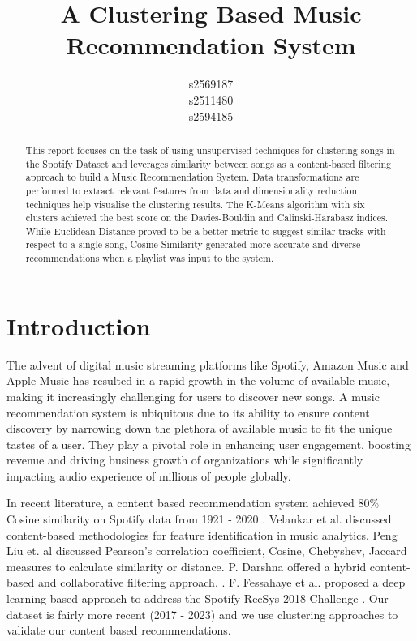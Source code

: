 \documentclass{article}
\title{A Clustering Based Music Recommendation System}
\author{
  s2569187\\
  \And
  s2511480\\
 \And
  s2594185\\
}
\begin{document}
\maketitle

\begin{abstract}

This report focuses on the task of using unsupervised techniques for clustering songs in the Spotify Dataset and leverages similarity between songs as a content-based filtering approach to build a Music Recommendation System. Data transformations are performed to extract relevant features from data and dimensionality reduction techniques help visualise the clustering results. The K-Means algorithm with six clusters achieved the best score on the Davies-Bouldin and Calinski-Harabasz indices. While Euclidean Distance proved to be a better metric to suggest similar tracks with respect to a single song, Cosine Similarity generated more accurate and diverse recommendations when a playlist was input to the system.

\end{abstract}

\section{Introduction}
The advent of digital music streaming platforms like Spotify, Amazon Music and Apple Music has resulted in a rapid growth in the volume of available music, making it increasingly challenging for users to discover new songs. A music recommendation system is ubiquitous due to its ability to ensure content discovery by narrowing down the plethora of available music to fit the unique tastes of a user. They play a pivotal role in enhancing user engagement, boosting revenue and driving business growth of organizations while significantly impacting audio experience of millions of people globally.

In recent literature, a content based recommendation system achieved 80\% Cosine similarity on Spotify data from 1921 - 2020 \cite{latex4e}. Velankar et al. \cite{latex6e} discussed content-based methodologies for feature identification in music analytics. Peng Liu et. al \cite{latex2e} discussed Pearson's correlation coefficient, Cosine, Chebyshev, Jaccard measures to calculate similarity or distance. P. Darshna offered a hybrid content-based and collaborative filtering approach. \cite{latex3e}. F. Fessahaye et al. proposed a deep learning based approach to address the Spotify RecSys 2018 Challenge \cite{latex1e}. Our dataset is fairly more recent (2017 - 2023) and we use clustering approaches to validate our content based recommendations.
\end{document}
